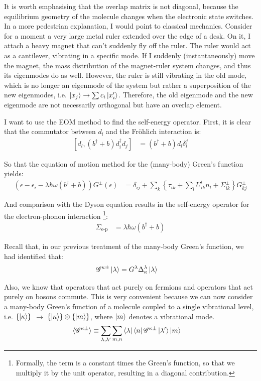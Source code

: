 It is worth emphasising that the overlap matrix is not diagonal, because the equilibrium geometry of the molecule changes when the electronic state switches. In a more pedestrian explanation, I would point to classical mechanics. Consider for a moment a very large metal ruler extended over the edge of a desk. On it, I attach a heavy magnet that can't suddenly fly off the ruler. The ruler would act as a cantilever, vibrating in a specific mode. If I suddenly (instantaneously) move the magnet, the mass distribution of  the magnet-ruler system changes, and thus its eigenmodes do as well. However, the ruler is still vibrating in the old mode, which is no longer an eigenmode of the system but rather a superposition of the new eigenmodes, i.e. $\ket{x_j} \rightarrow \sum c_i \ket{x'_i}$. Therefore, the old eigenmode and the new eigenmode are not necessarily orthogonal but have an overlap element. 

I want to use the EOM method to find the self-energy operator. First, it is clear that the commutator between $d_l$ and the Fr\"ohlich interaction is:
\begin{align*}
 \left[ d_l, (b^\dagger + b) d_i^\dagger d_j \right] &= (b^\dagger + b) d_l \delta^j_l
\end{align*}

So that the equation of motion method for the (many-body) Green's function yields:
\begin{align*}
\left(\epsilon-\epsilon_i - \lambda \hbar \omega \left(b^\dagger + b\right) \right) G^\pm (\epsilon) &= \delta_{ij} + \sum_k \left\{ \tau_{ik} + \sum_l U^l_{ik} n_l + \Sigma^\pm_{ik} \right\} G^\pm_{kj}
\end{align*}

And comparison with the Dyson equation results in the self-energy operator for the electron-phonon interaction \footnote{Formally, the term is a constant times the Green's function, so that we multiply it by the unit operator, resulting in a diagonal contribution.}:
\begin{align*}
\Sigma_\text{e-p} &= \lambda \hbar \omega ( b^\dagger + b)
\end{align*}

Recall that, in our previous treatment of the many-body Green's function, we had identified that:
\begin{align*}
\mathscr{G}^{\kappa\pm} \ket{\lambda} &= G^\lambda \Delta^\lambda_\kappa \ket{\lambda}
\end{align*}

Also, we know that operators that act purely on fermions and operators that act purely on bosons commute. This is very convenient because we can now consider a many-body Green's function of a molecule coupled to a single vibrational level, i.e. $\left\{\ket{\kappa}\right\} $ $\rightarrow$ $ \left\{\ket{\kappa}\right\} \otimes \left\{\ket{m}\right\}$, where $\ket{m}$ denotes a vibrational mode.
\begin{align*}
\braket{\mathscr{G}^{\kappa\pm}} &\equiv \sum_{\lambda, \lambda^\prime} \sum_{m,n} \bra{\lambda}\bra{n} \mathscr{G}^{\kappa\pm} \ket{\lambda^\prime}\ket{m} 
\end{align*}

